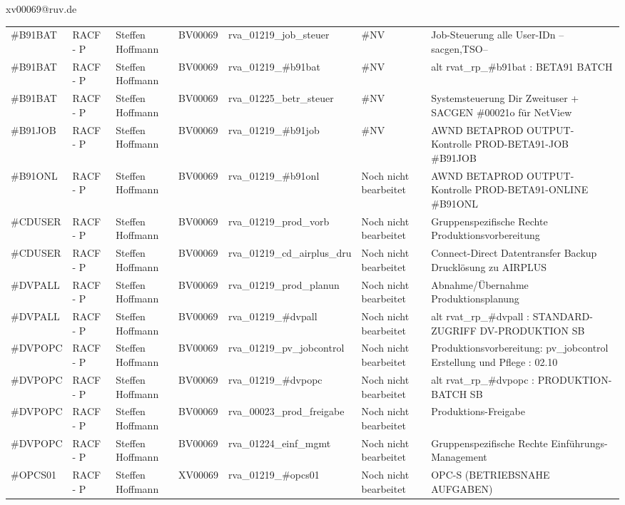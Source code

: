 \documentclass[a4paper,landscape,12pt]{letter}
\begin{document}
\begin{letter}{xv00069@ruv.de\hfill \break}
\begin{tiny}
\begin{longtable}{|p{35mm}|p{15mm}|p{25mm}|p{10mm}|p{40mm}|p{50mm}|p{50mm}|}
\#B91BAT & RACF - P & Steffen Hoffmann & BV00069 & rva\_01219\_job\_steuer & \#NV & Job-Steuerung alle User-IDn --sacgen,TSO-- \\
\#B91BAT & RACF - P & Steffen Hoffmann & BV00069 & rva\_01219\_\#b91bat & \#NV & alt rvat\_rp\_\#b91bat          : BETA91 BATCH \\
\#B91BAT & RACF - P & Steffen Hoffmann & BV00069 & rva\_01225\_betr\_steuer & \#NV & Systemsteuerung Dir Zweituser + SACGEN \#00021o für NetView \\
\#B91JOB & RACF - P & Steffen Hoffmann & BV00069 & rva\_01219\_\#b91job & \#NV & AWND BETAPROD OUTPUT-Kontrolle PROD-BETA91-JOB \#B91JOB \\
\#B91ONL & RACF - P & Steffen Hoffmann & BV00069 & rva\_01219\_\#b91onl & Noch nicht bearbeitet & AWND BETAPROD OUTPUT-Kontrolle PROD-BETA91-ONLINE \#B91ONL \\
\#CDUSER & RACF - P & Steffen Hoffmann & BV00069 & rva\_01219\_prod\_vorb & Noch nicht bearbeitet & Gruppenspezifische Rechte Produktionsvorbereitung \\
\#CDUSER & RACF - P & Steffen Hoffmann & BV00069 & rva\_01219\_cd\_airplus\_dru & Noch nicht bearbeitet & Connect-Direct Datentransfer Backup Drucklösung zu AIRPLUS \\
\#DVPALL & RACF - P & Steffen Hoffmann & BV00069 & rva\_01219\_prod\_planun & Noch nicht bearbeitet & Abnahme/Übernahme Produktionsplanung \\
\#DVPALL & RACF - P & Steffen Hoffmann & BV00069 & rva\_01219\_\#dvpall & Noch nicht bearbeitet & alt rvat\_rp\_\#dvpall          : STANDARD-ZUGRIFF DV-PRODUKTION SB \\
\#DVPOPC & RACF - P & Steffen Hoffmann & BV00069 & rva\_01219\_pv\_jobcontrol & Noch nicht bearbeitet & Produktionsvorbereitung: pv\_jobcontrol Erstellung und Pflege : 02.10 \\
\#DVPOPC & RACF - P & Steffen Hoffmann & BV00069 & rva\_01219\_\#dvpopc & Noch nicht bearbeitet & alt rvat\_rp\_\#dvpopc          : PRODUKTION-BATCH SB \\
\#DVPOPC & RACF - P & Steffen Hoffmann & BV00069 & rva\_00023\_prod\_freigabe & Noch nicht bearbeitet & Produktions-Freigabe \\
\#DVPOPC & RACF - P & Steffen Hoffmann & BV00069 & rva\_01224\_einf\_mgmt & Noch nicht bearbeitet & Gruppenspezifische Rechte Einführungs-Management \\
\#OPCS01 & RACF - P & Steffen Hoffmann & XV00069 & rva\_01219\_\#opcs01 & Noch nicht bearbeitet & OPC-S (BETRIEBSNAHE AUFGABEN) \\

\end{longtable}
\end{tiny}
\end{letter}
\end{document}

